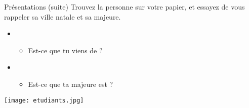 \begin{frame}{Présentations (suite)}
  Trouvez la personne sur votre papier, et essayez de vous rappeler sa ville natale et sa majeure.
  \begin{itemize}
    \item {}
    \begin{itemize}
      \item<2->[$\to$] Est-ce que tu viens de \underline{\hspace{3cm}}?
    \end{itemize}
    \item {}
    \begin{itemize}
      \item<3->[$\to$] Est-ce que ta majeure est \underline{\hspace{3cm}}?
    \end{itemize}
  \end{itemize}
  \begin{center}
    \texttt{[image: etudiants.jpg]}
  \end{center}
\end{frame}